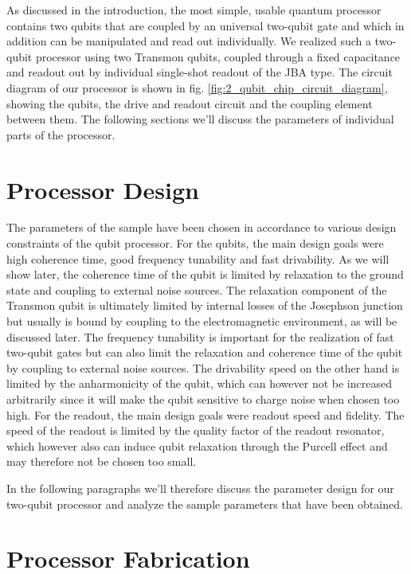 As discussed in the introduction, the most simple, usable quantum processor contains two qubits that are coupled by an universal two-qubit gate and which in addition can be manipulated and read out individually. We realized such a two-qubit processor using two Transmon qubits, coupled through a fixed capacitance and readout out by individual single-shot readout of the JBA type. The circuit diagram of our processor is shown in fig. \ref{fig:2_qubit_chip_circuit_diagram}, showing the qubits, the drive and readout circuit and the coupling element between them. The following sections we'll discuss the parameters of individual parts of the processor.

\section{Processor Design}

The parameters of the sample have been chosen in accordance to various design constraints of the qubit processor. For the qubits, the main design goals were high coherence time, good frequency tunability and fast drivability. As we will show later, the coherence time of the qubit is limited by relaxation to the ground state and coupling to external noise sources. The relaxation component of the Transmon qubit is ultimately limited by internal losses of the Josephson junction but usually is bound by coupling to the electromagnetic environment, as will be discussed later. The frequency tunability is important for the realization of fast two-qubit gates but can also limit the relaxation and coherence time of the qubit by coupling to external noise sources. The drivability speed on the other hand is limited by the anharmonicity of the qubit, which can however not be increased arbitrarily since it will make the qubit sensitive to charge noise when chosen too high. For the readout, the main design goals were readout speed and fidelity. The speed of the readout is limited by the quality factor of the readout resonator, which however also can induce qubit relaxation through the Purcell effect and may therefore not be chosen too small.

In the following paragraphs we'll therefore discuss the parameter design for our two-qubit processor and analyze the sample parameters that have been obtained.

\section{Processor Fabrication}

